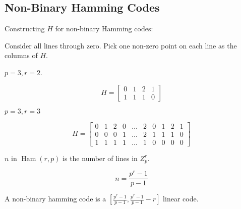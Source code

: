 \documentclass{article}
\DeclareMathOperator{\ham}{Ham}
\begin{document}
\subsection{Non-Binary Hamming Codes}
\begin{proposition}
  Constructing \( H \) for non-binary Hamming codes:

  Consider all lines through zero. Pick one non-zero point on each line as the columns of \( H \).
\end{proposition}
\begin{example}
  \( p=3, r =2 \).

  \[
    H = \begin{bmatrix}
      0 & 1 & 2 & 1 \\
      1 & 1 & 1 & 0
    \end{bmatrix}
  \]
\end{example}
\begin{example}
  \( p=3, r=3 \)

  \[
    H = \begin{bmatrix}
      0 & 1 & 2 & 0 & \dots & 2 & 0 & 1 & 2 & 1 \\
      0 & 0 & 0 & 1 & \dots & 2 & 1 & 1 & 1 & 0 \\
      1 & 1 & 1 & 1 & \dots & 1 & 0 & 0 & 0 & 0
    \end{bmatrix}
  \]
\end{example}
\begin{proposition}
  \( n \) in \( \ham(r, p) \) is the number of lines in \( Z_p^r \).

  \[ n = \frac{p^r-1}{p-1} \]
\end{proposition}
\begin{proposition}
  A non-binary hamming code is a \( [\frac{p^r-1}{p-1}, \frac{p^r-1}{p-1} - r] \) linear code.
\end{proposition}
\end{document}
